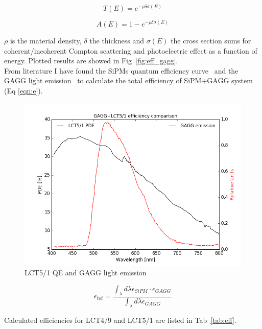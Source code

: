 \documentclass[10pt,a4paper, openany]{book}
\begin{document}
\begin{equation}
\label{eqn:t}
T(E) = e^{-\rho \delta \sigma(E)}
\end{equation}

\begin{equation}
\label{eqn:a}
A(E) = 1 - e^{-\rho \delta \sigma(E)}
\end{equation}

$\rho$ is the material density, $\delta$ the thickness and $\sigma(E)$ the cross section sums for coherent/incoherent Compton scattering and photoelectric effect as a function of energy. Plotted results are showed in Fig~\ref{fig:eff_gagg}.\\
From literature I have found the SiPMs quantum efficiency curve~\cite{bonanno:1} and the GAGG light emission~\cite{gagg:3} to calculate the total efficiency of SiPM+GAGG system (Eq \ref{eqn:e}).

\begin{figure}[!h]
\begin{center}
\includegraphics[scale=0.4]{imm/lct_gagg.png}
\end{center}
\caption{LCT5/1 QE and GAGG light emission}
\label{fig:lin1}
\end{figure}

\begin{equation}
\epsilon_{tot} = \frac{\int_{\lambda} d\lambda \epsilon_{SiPM} \cdot \epsilon_{GAGG} }{\int_{\lambda} d\lambda \epsilon_{GAGG} }
\label{eqn:e}
\end{equation}

Calculated efficiencies for LCT4/9 and LCT5/1 are listed in Tab~\ref{tab:eff}.
\end{document}
